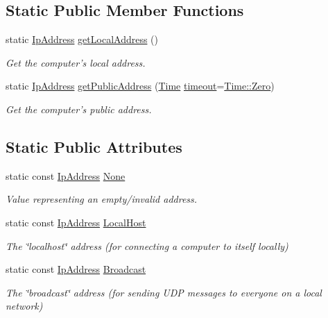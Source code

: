 \subsection*{Static Public Member Functions}
\begin{DoxyCompactItemize}
\item 
static \hyperlink{classsf_1_1_ip_address}{Ip\-Address} \hyperlink{classsf_1_1_ip_address_a4c31622ad87edca48adbb8e8ed00ee4a}{get\-Local\-Address} ()
\begin{DoxyCompactList}\small\item\em Get the computer's local address. \end{DoxyCompactList}\item 
static \hyperlink{classsf_1_1_ip_address}{Ip\-Address} \hyperlink{classsf_1_1_ip_address_a5c5cbf67e4aacf23c24f2ad991df4c55}{get\-Public\-Address} (\hyperlink{classsf_1_1_time}{Time} \hyperlink{gl3_8h_ad29bb0d8468b264a4e3d9204366cfaab}{timeout}=\hyperlink{classsf_1_1_time_a8db127b632fa8da21550e7282af11fa0}{Time\-::\-Zero})
\begin{DoxyCompactList}\small\item\em Get the computer's public address. \end{DoxyCompactList}\end{DoxyCompactItemize}
\subsection*{Static Public Attributes}
\begin{DoxyCompactItemize}
\item 
static const \hyperlink{classsf_1_1_ip_address}{Ip\-Address} \hyperlink{classsf_1_1_ip_address_a4619b4abbe3c8fef056e7299db967404}{None}
\begin{DoxyCompactList}\small\item\em Value representing an empty/invalid address. \end{DoxyCompactList}\item 
static const \hyperlink{classsf_1_1_ip_address}{Ip\-Address} \hyperlink{classsf_1_1_ip_address_a594d3a8e2559f8fa8ab0a96fa597333b}{Local\-Host}
\begin{DoxyCompactList}\small\item\em The \char`\"{}localhost\char`\"{} address (for connecting a computer to itself locally) \end{DoxyCompactList}\item 
static const \hyperlink{classsf_1_1_ip_address}{Ip\-Address} \hyperlink{classsf_1_1_ip_address_aa93d1d57b65d243f2baf804b6035465c}{Broadcast}
\begin{DoxyCompactList}\small\item\em The \char`\"{}broadcast\char`\"{} address (for sending U\-D\-P messages to everyone on a local network) \end{DoxyCompactList}\end{DoxyCompactItemize}


